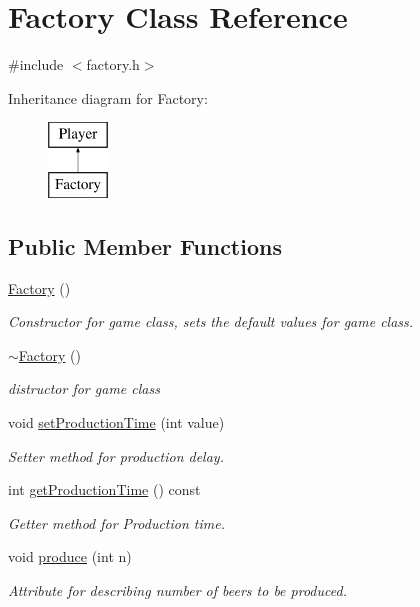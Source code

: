 \hypertarget{class_factory}{}\section{Factory Class Reference}
\label{class_factory}


{\ttfamily \#include $<$factory.\+h$>$}

Inheritance diagram for Factory\+:\begin{figure}[H]
\begin{center}
\leavevmode
\includegraphics[height=2.000000cm]{class_factory}
\end{center}
\end{figure}
\subsection*{Public Member Functions}
\begin{DoxyCompactItemize}
\item 
\hyperlink{class_factory_ac792bf88cfb7b6804b479529da5308cc}{Factory} ()
\begin{DoxyCompactList}\small\item\em Constructor for game class, sets the default values for game class. \end{DoxyCompactList}\item 
\hyperlink{class_factory_a8f71456f48e4df402c778a44191ff40e}{$\sim$\+Factory} ()
\begin{DoxyCompactList}\small\item\em distructor for game class \end{DoxyCompactList}\item 
void \hyperlink{class_factory_a8567550501860453df05d6afae963997}{set\+Production\+Time} (int value)
\begin{DoxyCompactList}\small\item\em Setter method for production delay. \end{DoxyCompactList}\item 
int \hyperlink{class_factory_a7020f06a3b9045d0902cd3740796ded5}{get\+Production\+Time} () const
\begin{DoxyCompactList}\small\item\em Getter method for Production time. \end{DoxyCompactList}\item 
void \hyperlink{class_factory_a321703fafe2a870260e04b848aa565d2}{produce} (int n)
\begin{DoxyCompactList}\small\item\em Attribute for describing number of beers to be produced. \end{DoxyCompactList}\end{DoxyCompactItemize}
